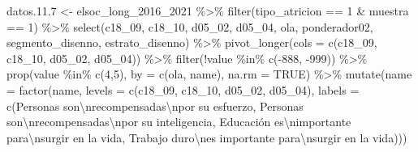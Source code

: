 \documentclass[
  12pt,
]{book}
\newenvironment{Shaded}{\begin{snugshade}}{\end{snugshade}}
\newcommand{\AttributeTok}[1]{\textcolor[rgb]{0.77,0.63,0.00}{#1}}
\newcommand{\ConstantTok}[1]{\textcolor[rgb]{0.00,0.00,0.00}{#1}}
\newcommand{\DecValTok}[1]{\textcolor[rgb]{0.00,0.00,0.81}{#1}}
\newcommand{\FloatTok}[1]{\textcolor[rgb]{0.00,0.00,0.81}{#1}}
\newcommand{\FunctionTok}[1]{\textcolor[rgb]{0.00,0.00,0.00}{#1}}
\newcommand{\NormalTok}[1]{#1}
\newcommand{\OtherTok}[1]{\textcolor[rgb]{0.56,0.35,0.01}{#1}}
\newcommand{\SpecialCharTok}[1]{\textcolor[rgb]{0.00,0.00,0.00}{#1}}
\newcommand{\StringTok}[1]{\textcolor[rgb]{0.31,0.60,0.02}{#1}}
\begin{document}
\begin{Shaded}
\begin{Highlighting}[]
\NormalTok{datos.}\FloatTok{11.7} \OtherTok{\textless{}{-}}\NormalTok{ elsoc\_long\_2016\_2021 }\SpecialCharTok{\%\textgreater{}\%} 
  \FunctionTok{filter}\NormalTok{(tipo\_atricion }\SpecialCharTok{==} \DecValTok{1} \SpecialCharTok{\&}\NormalTok{ muestra }\SpecialCharTok{==} \DecValTok{1}\NormalTok{) }\SpecialCharTok{\%\textgreater{}\%}  
  \FunctionTok{select}\NormalTok{(c18\_09, c18\_10, d05\_02, d05\_04, ola, ponderador02, segmento\_disenno, estrato\_disenno) }\SpecialCharTok{\%\textgreater{}\%} 
  \FunctionTok{pivot\_longer}\NormalTok{(}\AttributeTok{cols =} \FunctionTok{c}\NormalTok{(c18\_09, c18\_10, d05\_02, d05\_04)) }\SpecialCharTok{\%\textgreater{}\%} 
  \FunctionTok{filter}\NormalTok{(}\SpecialCharTok{!}\NormalTok{value }\SpecialCharTok{\%in\%} \FunctionTok{c}\NormalTok{(}\SpecialCharTok{{-}}\DecValTok{888}\NormalTok{, }\SpecialCharTok{{-}}\DecValTok{999}\NormalTok{)) }\SpecialCharTok{\%\textgreater{}\%} 
  \FunctionTok{prop}\NormalTok{(value }\SpecialCharTok{\%in\%} \FunctionTok{c}\NormalTok{(}\DecValTok{4}\NormalTok{,}\DecValTok{5}\NormalTok{), }\AttributeTok{by =} \FunctionTok{c}\NormalTok{(ola, name), }\AttributeTok{na.rm =} \ConstantTok{TRUE}\NormalTok{) }\SpecialCharTok{\%\textgreater{}\%} 
  \FunctionTok{mutate}\NormalTok{(}\AttributeTok{name =} \FunctionTok{factor}\NormalTok{(name,}
                       \AttributeTok{levels =} \FunctionTok{c}\NormalTok{(}\StringTok{\textquotesingle{}c18\_09\textquotesingle{}}\NormalTok{, }\StringTok{\textquotesingle{}c18\_10\textquotesingle{}}\NormalTok{, }\StringTok{\textquotesingle{}d05\_02\textquotesingle{}}\NormalTok{, }\StringTok{\textquotesingle{}d05\_04\textquotesingle{}}\NormalTok{),}
                       \AttributeTok{labels =} \FunctionTok{c}\NormalTok{(}\StringTok{\textquotesingle{}Personas son}\SpecialCharTok{\textbackslash{}n}\StringTok{recompensadas}\SpecialCharTok{\textbackslash{}n}\StringTok{por su esfuerzo\textquotesingle{}}\NormalTok{,}
                               \StringTok{\textquotesingle{}Personas son}\SpecialCharTok{\textbackslash{}n}\StringTok{recompensadas}\SpecialCharTok{\textbackslash{}n}\StringTok{por su inteligencia\textquotesingle{}}\NormalTok{,}
                               \StringTok{\textquotesingle{}Educación es}\SpecialCharTok{\textbackslash{}n}\StringTok{importante para}\SpecialCharTok{\textbackslash{}n}\StringTok{surgir en la vida\textquotesingle{}}\NormalTok{,}
                               \StringTok{\textquotesingle{}Trabajo duro}\SpecialCharTok{\textbackslash{}n}\StringTok{es importante para}\SpecialCharTok{\textbackslash{}n}\StringTok{surgir en la vida\textquotesingle{}}\NormalTok{)))}


\end{Highlighting}
\end{Shaded}
\end{document}
